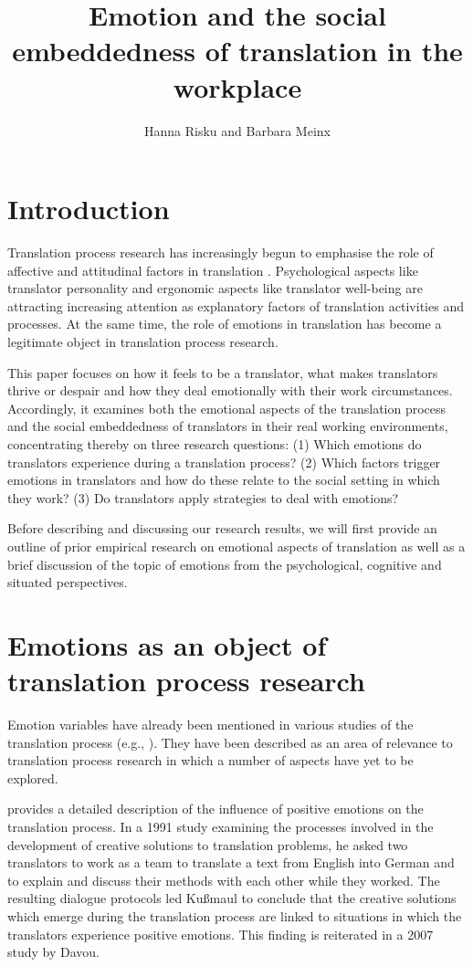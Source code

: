 \documentclass[output=paper]{langscibook}
\author{Hanna Risku\affiliation{University of Vienna} and Barbara Meinx\affiliation{Oesterreichische Nationalbank}}
\title{Emotion and the social embeddedness of translation in the workplace}
\begin{document}
\maketitle

\section{Introduction} 
Translation process research has increasingly begun to emphasise the role of affective and attitudinal factors in translation \citep{Laukkanen1996}. Psychological aspects like translator personality \citep{Hubscher-Davidson2009} and ergonomic aspects like translator well-being \citep{Ehrensberger-Dow2018} are attracting increasing attention as explanatory factors of translation activities and processes. At the same time, the role of emotions in translation has become a legitimate object in translation process research.

This paper focuses on how it feels to be a translator, what makes translators thrive or despair and how they deal emotionally with their work circumstances. Accordingly, it examines both the emotional aspects of the translation process and the social embeddedness of translators in their real working environments, concentrating thereby on three research questions: (1) Which emotions do translators experience during a translation process? (2) Which factors trigger emotions in translators and how do these relate to the social setting in which they work? (3) Do translators apply strategies to deal with emotions?

Before describing and discussing our research results, we will first provide an outline of prior empirical research on emotional aspects of translation as well as a brief discussion of the topic of emotions from the psychological, cognitive and situated perspectives.

\section{Emotions as an object of translation process research}
Emotion variables have already been mentioned in various studies of the translation process (e.g., \citealp{Kußmaul1991, Tirkkonen-Condit1996, Jääskeläinen1996, Davou2007, RojoLópez2014, RojoLópez2016, Hubscher-Davidson2009, Hubscher-Davidson2013, Lehr2014}). They have been described as an area of relevance to translation process research in which a number of aspects have yet to be explored.

\citet{Kußmaul1991} provides a detailed description of the influence of positive emotions on the translation process. In a 1991 study examining the processes involved in the development of creative solutions to translation problems, he asked two translators to work as a team to translate a text from English into German and to explain and discuss their methods with each other while they worked. The resulting dialogue protocols led Kußmaul to conclude that the creative solutions which emerge during the translation process are linked to situations in which the translators experience positive emotions. This finding is reiterated in a 2007 study by Davou.
\end{document}
